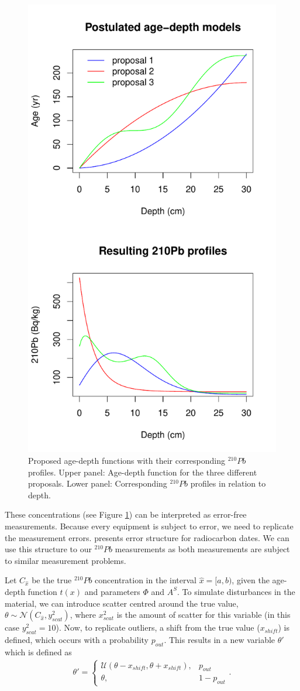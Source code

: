 \documentclass [10pt] {article}
\begin{document}
\begin{figure}[!h]
 \centering
  \includegraphics[width=0.5\linewidth]{Chronology-profile.pdf}
	\caption{Proposed age-depth functions with their corresponding $^{210}Pb$ profiles. Upper panel: Age-depth function for the three different proposals. Lower panel: Corresponding $^{210}Pb$ profiles in relation to depth.}
  \label{fig:true_210}
\end{figure}

	These concentrations (see Figure \ref{fig:true_210}) can be interpreted as error-free measurements. 
Because every equipment is subject to error, we need to replicate the measurement errors. 
\citet{Blaauw2018} presents error structure for radiocarbon dates. 
We can use this structure to our $^{210}Pb$ measurements as both measurements are subject to similar measurement problems. 

	Let $C_{\hat{x}}$ be the true  $^{210}Pb$ concentration in the interval $\hat{x}=[a,b)$, given the age-depth function $t(x)$ and parameters $\Phi$ and $A^S$. 
To simulate disturbances in the material, we can introduce scatter centred around the true value, $\theta \sim \mathcal{N}\left(C_{\hat{x}},y^2_{scat}\right)$, where $x^2_{scat}$ is the amount of scatter for this variable (in this case $y^2_{scat}=10$). 
Now, to replicate outliers, a shift from the true value ($x_{shift}$) is defined, which occurs with a probability $p_{out}$. This results in a new variable $\theta'$ which is defined as
\begin{align}
	\theta' = \begin{cases}
			\mathcal{U}(\theta - x_{shift},\theta + x_{shift}), &  p_{out} \\
			\theta, & 1-p_{out}
		\end{cases}.
\end{align}
\end{document}
